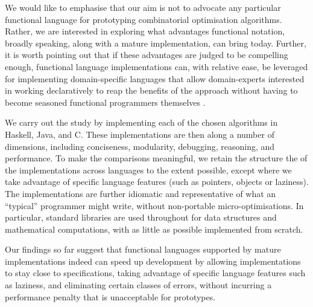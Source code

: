 We would like to emphasise that our aim is not to advocate any particular
functional language for prototyping combinatorial optimisation algorithms.
Rather, we are interested in exploring what advantages functional notation,
broadly speaking, along with a mature implementation, can bring today.
Further, it is worth pointing out that if these advantages are judged
to be compelling enough, functional language implementations can,
with relative ease, be leveraged for implementing domain-specific languages
that allow domain-experts interested in working declaratively to reap
the benefits of the approach without having to become seasoned functional
programmers themselves \cite{Hudak1998}.

We carry out the study by implementing each of the chosen algorithms in
Haskell, Java, and C. These implementations are then along a number of
dimensions, including conciseness, modularity, debugging, reasoning, and
performance. To make the comparisons meaningful, we retain the structure the
of the implementations across languages to the extent possible, except where
we take advantage of specific language features (such as pointers, objects or
laziness). The implementations are further idiomatic and representative of
what an ``typical'' programmer might write, without non-portable
micro-optimisations. In particular, standard libraries are used throughout for
data structures and mathematical computations, with as little as possible
implemented from scratch.

Our findings so far suggest that functional languages supported by mature
implementations indeed can speed up development by allowing implementations to
stay close to specifications, taking advantage of specific language features
such as laziness, and eliminating certain classes of errors, without incurring
a performance penalty that is unacceptable for prototypes.
